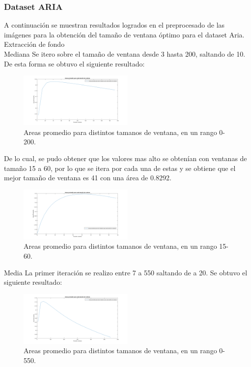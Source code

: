 \subsubsection{Dataset ARIA}

A continuación se muestran resultados logrados en el preprocesado de las imágenes para la obtención del tamaño de ventana óptimo para el dataset Aria.\\

Extracción de fondo\\

Mediana 
 Se itero sobre el tamaño de ventana desde 3 hasta 200, saltando de 10. De esta forma se obtuvo el siguiente resultado:

\begin{figure}[h]
	{
	\centering
	\includegraphics[width=0.50\textwidth]{Figures/MedianaRangoGrande}
	\caption[An Electron]{Areas promedio para distintos tamanos de ventana, en un rango 0-200.}
	}
\end{figure}	

De lo cual, se pudo obtener que los valores mas alto se obtenían con ventanas de tamaño 15 a 60, por lo que se itera por cada una de estas y se obtiene que el mejor tamaño de ventana es 41 con una área de 0.8292.

	\begin{figure}[h]
	{
	\centering
	\includegraphics[width=0.50\textwidth]{Figures/MedianaRangoChico}
	\caption[An Electron]{Areas promedio para distintos tamanos de ventana, en un rango 15-60.}
	}
	\end{figure}	

Media 
La primer iteración se realizo entre 7 a 550 saltando de a 20. Se obtuvo el siguiente resultado:

\begin{figure}[h]
	{
	\centering
	\includegraphics[width=0.50\textwidth]{Figures/MediaRangoGrande}
	\caption[An Electron]{Areas promedio para distintos tamanos de ventana, en un rango 0-550.}
	}
\end{figure}

